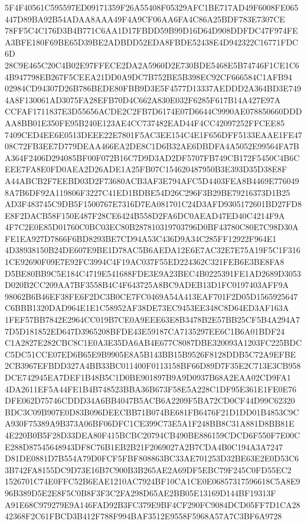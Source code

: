 \documentclass[UTF8,fontset=fandol,zihao=-4,a4paper]{ctexart}
\begin{document}
{{5F4F40561C595597ED09171359F26A55408F05329AFC1BE717AD49F6008FE065447D89BA92B54ADAA8AAA49F4A9CF06AA6FA4C86A25BDF783E7307CE
78FF5C4C176D3B4B771C6AA1D17FBDD59B99D16D64D908DDFDC47F974FEA3BFE180F69BE65D39BE2ADBDD52EDA8FBDE52438E4D942322C16771FDC6D
28C9E465C20C4B02E97FFECE2DA2A5960D2E730BDE5468E5B74746F1CE1C64B947798EB267F5CEEA21DD0A9DC7B752BE5B398EC92CF666584C1AFB94
02984CD94307D26B786BEDE80FBB9D3E5F4577D13337AEDDD2A364BD3E7494A8F130061AD3075FA28EFB70D4C662A830E032F6285F617B14A427E97A
CCFAF1711837E3D55656ACDE2C2FB7D6174E07D6644C9990AE078850660DDDAA8BB01E350FE95B240E123AE4CC737482EAD44F4CC42097252FFCEE85
7409CED4EE6E0513DEEE22E7801F5AC3EE154C4E1F656DFF5133EAAE1FE4708C72FB3EE7D779DEAA466EA2DE8C1D6B32AE6DBDFA4A5052E99564FA7B
A364F2406D294085BF00F072B16C7D9D3AD2DF5707FB749CB172F5450C4B6CEEE7FA8E0FD0AEA2D26ADE1A25FB07C154620487950B3E393D35D38E8F
A44ABCB2F7EEBD03D2F73680ACB3AF3E794AFC5D4403FEA8B4469E7760498A7B6DF92A119806F3227C41ED1BDBE54D26C296F3B29BE79216373D1B25
AD3F483745C9DB5F1500767E7316D7EA081701C24D3AFD9305172601BD27FD8E8F2DACB58F150E487F28CE6424B558D2FA6DC0AEAD47ED40C4214F9A
4F7C2E0E85D01760C0BC03EC80B287810319703796D0BF43780C80E7C98D30AFE1EA927D7866F6BD8293BE7CD94A53C436D9A34C285FF12922F964E1
4D38938150B24DE607E9BE1D78AC5B6AEDA12E6E7AC32E7E75A19F5C1F3161CE92690F09E7E92FC3994C4F19AC037F55ED224362C321FEB6E3BE8FA8
D5BE80BB9C5E184C4719E541688FDE3E9A23BEC4B0225391FE1AD2689D3053D020B2CC209AA7BF3558B4C4F643725A8BC9ADEB13D1FC0197403AFF9A
98062B6B46EF38FE6F2DC3B0CE7FC0469A54A413EAF701F2D05D1565925647C6BBB1320DAD964E1E1C58952AF38DE73EC9453EE348C8D64ED3AF163A
1FEF57BB7842E2964CC019B7CE0A9EEE63E8B3478B2E57BB25CF5B4A294A77D5D181852ED647D3965208BFDE43E59187CA7135297EE6C1B6A01BDF24
C1A2827E282CBC8C1E0A3E35DA6AB4E677C8087DBE320093A1203FC225BDCC5DC51CCE07ED6B65E9B9905E8A5B143BB15B9526F8128DDB5C72A9EFBE
2CB3967EFBDD327A4BB33BC011400F0113158BF66D89D7F35E2C713E3CB958DCE742945EA7DEF1B48B5C1D0BE901897B9A9D0937B68A2EAA02CD9FA1
4DA2611EF5A44FE1B4B748523BBA36B673F58E5A228C1DF95E361E1FE0E76DFE062D75746CDDD34A6BB4047B5ACB6A2209F5BA72CD0CF44D99C62320
BDC3C09B907E0D83B096DEECBB71B074BE681FB6476F21D1DD01B4853C9CA930F75389A9B373A06BF06DFC1CE399C73E5A1F248BB8C31A881D8BB81E
4E220B0B5F28D33DEA80F415BCBC20794CB490BE886159CDCD6F550F7E00CE288D87545648943DF8C76B1EB2B21F2069027A2B7CDA4B0C194A3A7247
D81DE0881D7B554A79D0FCF5FBF808863BC33AE701253D32BE63E2E0D53C63B742FA8155DC9D73E16B7C900B3B265AE2A69DF5EBC79F245C0FD55EC2
1526701C74E0FFC52B6EAE1210AC7924BF10CA1CE0E06857317596618C5A8E996B389D5E2E8F5C0B8F3F3C2FA298D65AE2BB05E13169D144BF19313F
A91E68C979279E9A146FAD92B3FC379E9BF4CF290FC9084DCD05FF7D1CA2842368F2C61FBCD3B412F788F994BAF3512E9558F5968A57A7C3BF6A9728
}}
\end{document}
